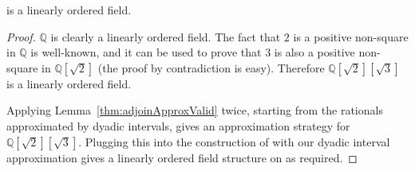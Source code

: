 \begin{corollary}
  \label{thm:numberType}
  \leanok
   is a linearly ordered field.
\end{corollary}
\begin{proof}
  \leanok
  $ℚ$ is clearly a linearly ordered field. The fact that $2$ is a positive
  non-square in $ℚ$ is well-known, and it can be used to prove that $3$ is also
  a positive non-square in $ℚ[\sqrt{2}]$ (the proof by contradiction is easy).
  Therefore $ℚ[\sqrt{2}][\sqrt{3}]$ is a linearly ordered field.

  Applying Lemma~\ref{thm:adjoinApproxValid} twice, starting from the
  rationals approximated by dyadic intervals, gives an approximation strategy
  for $ℚ[\sqrt{2}][\sqrt{3}]$. Plugging this into the construction of
   with our dyadic interval approximation gives a linearly
  ordered field structure on  as
  required.
\end{proof}

